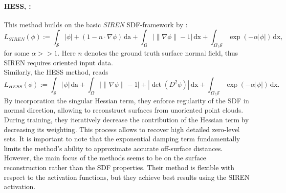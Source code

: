 \documentclass[12pt,openany]{book}
\def\S{\mathcal{S}}
\theoremstyle{plainnormal}
\theoremstyle{remark}
\begin{document}
\paragraph{HESS, \cite{wang2023neuralsingularhessianimplicitneuralrepresentation}:} This method builds on the basic \emph{SIREN} SDF-framework by \cite{sitzmann2020implicitneuralrepresentationsperiodic}:
$$
L_{SIREN}(\phi) := \int_\S |\phi| + (1-n\cdot\nabla \phi) \,\mathrm{da} + \int_\Omega \big|\|\nabla \phi\| - 1\big| \,\mathrm{dx} + \int_{\Omega\setminus\S} \exp(-\alpha |\phi|) \,\mathrm{dx},
$$
for some $\alpha >> 1$. Here $n$ denotes the ground truth surface normal field, thus SIREN requires oriented input data.\\
Similarly, the HESS method, reads
$$L_{HESS}(\phi) := \int_\S |\phi| \,\mathrm{da} + \int_\Omega \big|\|\nabla \phi\| - 1\big|  + |\det(D^2\phi)| \,\mathrm{dx} + \int_{\Omega\setminus\S} \exp(-\alpha |\phi|) \,\mathrm{dx}. $$
By incorporation the singular Hessian term, they enforce regularity of the SDF in normal direction, allowing to reconstruct surfaces from unoriented point clouds. \\
During training, they iteratively decrease the contribution of the Hessian term by decreasing its weighting. This process allows to recover high detailed zero-level sets. It is important to note that the exponential damping term fundamentally limits the method’s ability to approximate accurate off-surface distances. However, the main focus of the methods seems to be on the surface reconstruction rather than the SDF properties. Their method is flexible with respect to the activation functions, but they achieve best results using the SIREN activation. 
\end{document}
